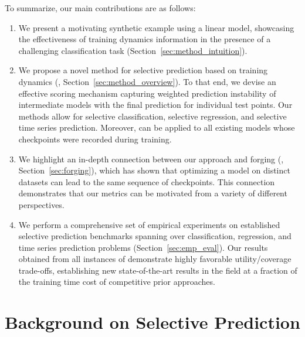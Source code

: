 To summarize, our main contributions are as follows: 
\begin{enumerate}
    \item We present a motivating synthetic example using a linear model, showcasing the effectiveness of training dynamics information in the presence of a challenging classification task (Section~\ref{sec:method_intuition}). 
    \item We propose a novel method for selective prediction based on training dynamics (\sptd, Section~\ref{sec:method_overview}). To that end, we devise an effective scoring mechanism capturing weighted prediction instability of intermediate models with the final prediction for individual test points. Our methods allow for selective classification, selective regression, and selective time series prediction. Moreover, \sptd can be applied to all existing models whose checkpoints were recorded during training.
    \item We highlight an in-depth connection between our \sptd approach and forging (\cite{thudi2022necessity}, Section~\ref{sec:forging}), which has shown that optimizing a model on distinct datasets can lead to the same sequence of checkpoints. This connection demonstrates that our metrics can be motivated from a variety of different perspectives.
    \item We perform a comprehensive set of empirical experiments on established selective prediction benchmarks spanning over classification, regression, and time series prediction problems (Section~\ref{sec:emp_eval}). 
    Our results obtained from all instances of \sptd demonstrate highly favorable utility/coverage trade-offs, establishing new state-of-the-art results in the field at a fraction of the training time cost of competitive prior approaches. 
\end{enumerate}


\section{Background on Selective Prediction}
\label{sec:background_sptd}

